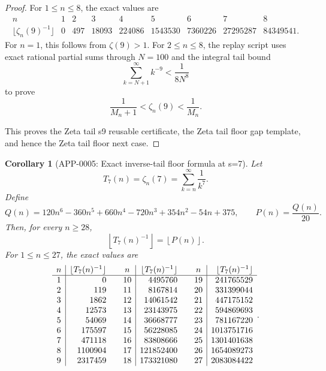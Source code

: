 \documentclass[11pt]{article}
\numberwithin{equation}{section}
\newtheorem{corollary}[theorem]{Corollary}
\theoremstyle{definition}
\theoremstyle{remark}
\newcommand{\1}{\mathbf 1}
\begin{document}
\begin{proof}
For \(1\le n\le8\), the exact values are
\[
\begin{array}{c|rrrrrrrr}
n&1&2&3&4&5&6&7&8\\
\hline
\lfloor\zeta_n(9)^{-1}\rfloor&0&497&18093&224086&1543530&7360226&27295287&84349541.
\end{array}
\]
For \(n=1\), this follows from \(\zeta(9)>1\). For \(2\le n\le8\), the replay script uses exact rational partial sums through \(N=100\) and the integral tail bound
\[
\sum_{k=N+1}^{\infty}k^{-9}<\frac{1}{8N^8}
\]
to prove
\[
\frac1{M_n+1}<\zeta_n(9)<\frac1{M_n}.
\]

This proves the Zeta tail s9 reusable certificate, the Zeta tail floor gap template, and hence the Zeta tail floor next case.
\end{proof}

\begin{corollary}[APP-0005: Exact inverse-tail floor formula at s=7]
\label{thm:tail-s7-floor}
Let
\begin{equation}
\label{eq:tail-s7}
T_7(n)=\zeta_n(7)=\sum_{k=n}^{\infty}\frac1{k^7}.
\end{equation}
Define
\begin{equation}
\label{eq:tail-s7-q}
Q(n)=120n^6-360n^5+660n^4-720n^3+354n^2-54n+375,
\qquad
P(n)=\frac{Q(n)}{20}.
\end{equation}
Then, for every \(n\ge28\),
\begin{equation}
\label{eq:tail-s7-floor}
\left\lfloor T_7(n)^{-1}\right\rfloor=\left\lfloor P(n)\right\rfloor.
\end{equation}
For \(1\le n\le27\), the exact values are
\begin{equation}
\label{eq:tail-s7-finite-table}
\begin{array}{c|r@{\qquad}c|r@{\qquad}c|r}
n&\lfloor T_7(n)^{-1}\rfloor&n&\lfloor T_7(n)^{-1}\rfloor&n&\lfloor T_7(n)^{-1}\rfloor\\
\hline
1&0&10&4495760&19&241765529\\
2&119&11&8167814&20&331399044\\
3&1862&12&14061542&21&447175152\\
4&12573&13&23143975&22&594869693\\
5&54069&14&36668777&23&781167220\\
6&175597&15&56228085&24&1013751716\\
7&471118&16&83808666&25&1301401638\\
8&1100904&17&121852400&26&1654089273\\
9&2317459&18&173321080&27&2083084422
\end{array}.
\end{equation}


\end{corollary}
\end{document}
